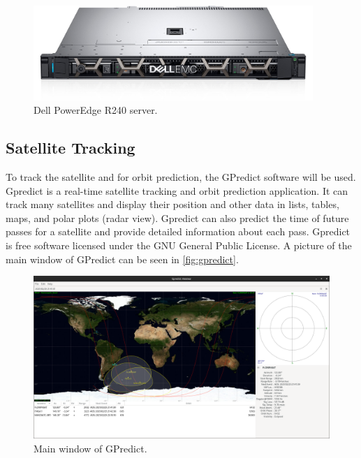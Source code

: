 \begin{figure}[!ht]
    \begin{center}
        \includegraphics[width=300pt]{figures/server.jpg}
        \caption{Dell PowerEdge R240 server.}
        \label{fig:server}
    \end{center}
\end{figure}

\subsection{Satellite Tracking}

To track the satellite and for orbit prediction, the GPredict software \cite{gpredict} will be used. Gpredict is a real-time satellite tracking and orbit prediction application. It can track many satellites and display their position and other data in lists, tables, maps, and polar plots (radar view). Gpredict can also predict the time of future passes for a satellite and provide detailed information about each pass. Gpredict is free software licensed under the GNU General Public License. A picture of the main window of GPredict can be seen in \autoref{fig:gpredict}.

\begin{figure}[!ht]
    \begin{center}
        \includegraphics[width=\textwidth]{figures/gpredict.png}
        \caption{Main window of GPredict.}
        \label{fig:gpredict}
    \end{center}
\end{figure}

